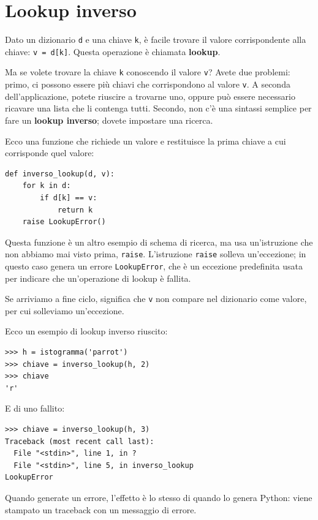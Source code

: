 \documentclass[10pt]{book}
\begin{document}
\section{Lookup inverso}
\label{raise}

Dato un dizionario {\tt d} e una chiave {\tt k}, è facile trovare il valore corrispondente alla chiave: {\tt v = d[k]}.  Questa operazione è chiamata {\bf lookup}.

Ma se volete trovare la chiave {\tt k} conoscendo il valore {\tt v}?
Avete due problemi: primo, ci possono essere più chiavi che corrispondono al valore {\tt v}.  A seconda dell'applicazione, potete riuscire a trovarne uno, oppure può essere necessario ricavare una lista che li contenga tutti. Secondo, non c'è una sintassi semplice per fare un {\bf lookup inverso}; dovete impostare una ricerca.

Ecco una funzione che richiede un valore e restituisce la prima chiave a cui corrisponde quel valore:

\begin{verbatim}
def inverso_lookup(d, v):
    for k in d:
        if d[k] == v:
            return k
    raise LookupError()
\end{verbatim}
%
Questa funzione è un altro esempio di schema di ricerca, ma usa un'istruzione che non abbiamo mai visto prima, {\tt raise}.  L'istruzione {\tt raise}
solleva un'eccezione; in questo caso genera un errore {\tt LookupError}, che è un eccezione predefinita usata per indicare che un'operazione di lookup è fallita.

Se arriviamo a fine ciclo, significa che {\tt v}
non compare nel dizionario come valore, per cui solleviamo un'eccezione.

Ecco un esempio di lookup inverso riuscito:

\begin{verbatim}
>>> h = istogramma('parrot')
>>> chiave = inverso_lookup(h, 2)
>>> chiave
'r'
\end{verbatim}
%
E di uno fallito:

\begin{verbatim}
>>> chiave = inverso_lookup(h, 3)
Traceback (most recent call last):
  File "<stdin>", line 1, in ?
  File "<stdin>", line 5, in inverso_lookup
LookupError
\end{verbatim}
%
Quando generate un errore, l'effetto è lo stesso di quando lo genera Python: viene stampato un traceback con un messaggio di errore.
\end{document}
